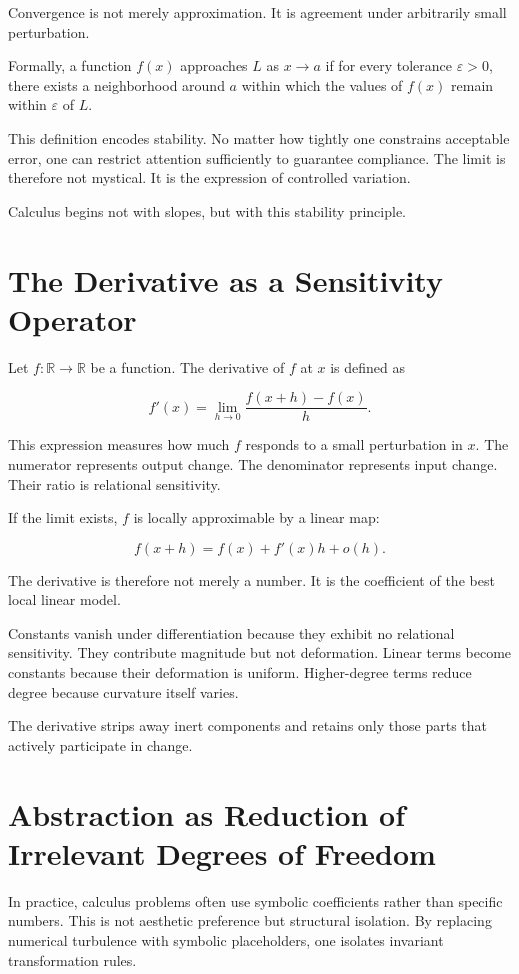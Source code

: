 \documentclass[12pt]{book}
\begin{document}
Convergence is not merely approximation. It is agreement under arbitrarily small perturbation.

Formally, a function $f(x)$ approaches $L$ as $x \to a$ if for every tolerance $\varepsilon > 0$, there exists a neighborhood around $a$ within which the values of $f(x)$ remain within $\varepsilon$ of $L$. 

This definition encodes stability. No matter how tightly one constrains acceptable error, one can restrict attention sufficiently to guarantee compliance. The limit is therefore not mystical. It is the expression of controlled variation.

Calculus begins not with slopes, but with this stability principle.

\section{The Derivative as a Sensitivity Operator}

Let $f : \mathbb{R} \to \mathbb{R}$ be a function. The derivative of $f$ at $x$ is defined as

\[
f'(x) = \lim_{h \to 0} \frac{f(x+h) - f(x)}{h}.
\]

This expression measures how much $f$ responds to a small perturbation in $x$. The numerator represents output change. The denominator represents input change. Their ratio is relational sensitivity.

If the limit exists, $f$ is locally approximable by a linear map:

\[
f(x + h) = f(x) + f'(x)h + o(h).
\]

The derivative is therefore not merely a number. It is the coefficient of the best local linear model.

Constants vanish under differentiation because they exhibit no relational sensitivity. They contribute magnitude but not deformation. Linear terms become constants because their deformation is uniform. Higher-degree terms reduce degree because curvature itself varies.

The derivative strips away inert components and retains only those parts that actively participate in change.

\section{Abstraction as Reduction of Irrelevant Degrees of Freedom}

In practice, calculus problems often use symbolic coefficients rather than specific numbers. This is not aesthetic preference but structural isolation. By replacing numerical turbulence with symbolic placeholders, one isolates invariant transformation rules.
\end{document}
